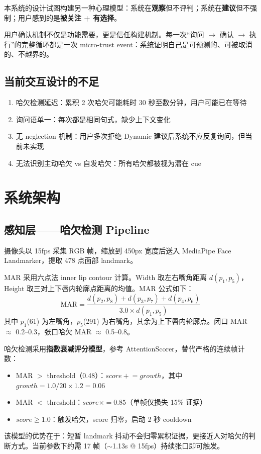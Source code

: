 \documentclass[12pt,a4paper]{ctexart}
\begin{document}
本系统的设计试图构建另一种心理模型：系统在\textbf{观察}但不评判；系统在\textbf{建议}但不强制；用户感到的是\textbf{被关注 + 有选择}。

用户确认机制不仅是功能需要，更是信任构建机制。每一次“询问 $\rightarrow$ 确认 $\rightarrow$ 执行”的完整循环都是一次 micro-trust event：系统证明自己是可预测的、可被取消的、不越界的。

\subsection{当前交互设计的不足}

\begin{enumerate}[label=\arabic*.]
    \item 哈欠检测延迟：累积 2 次哈欠可能耗时 30 秒至数分钟，用户可能已在等待
    \item 询问语单一：每次都是相同句式，缺少上下文变化
    \item 无 neglection 机制：用户多次拒绝 Dynamic 建议后系统不应反复询问，但当前未实现
    \item 无法识别主动哈欠 vs 自发哈欠：所有哈欠都被视为潜在 cue
\end{enumerate}

\section{系统架构}

\subsection{感知层——哈欠检测 Pipeline}

摄像头以 15fps 采集 RGB 帧，缩放到 450px 宽度后送入 MediaPipe Face Landmarker，提取 478 点面部 landmark。

MAR 采用六点法 inner lip contour 计算。Width 取左右嘴角距离 $d(p_1, p_5)$，Height 取三对上下唇内轮廓点距离的均值。MAR 公式如下：
\begin{equation}
\text{MAR} = \frac{d(p_2,p_8) + d(p_3,p_7) + d(p_4,p_6)}{3.0 \times d(p_1,p_5)}
\end{equation}
其中 $p_1$(61) 为左嘴角，$p_5$(291) 为右嘴角，其余为上下唇内轮廓点。闭口 MAR $\approx$ 0.2--0.3，张口哈欠 MAR $\approx$ 0.5--0.8。

哈欠检测采用\textbf{指数衰减评分模型}，参考 AttentionScorer\cite{candeloro}，替代严格的连续帧计数：
\begin{itemize}
    \item MAR $>$ threshold（0.48）：$score \mathrel{+}= growth$，其中 $growth = 1.0 / 20 \times 1.2 = 0.06$
    \item MAR $<$ threshold：$score \times= 0.85$（单帧仅损失 15\% 证据）
    \item $score \geq 1.0$：触发哈欠，score 归零，启动 2 秒 cooldown
\end{itemize}
该模型的优势在于：短暂 landmark 抖动不会归零累积证据，更接近人对哈欠的判断方式。当前参数下约需 17 帧（$\sim$1.13s @ 15fps）持续张口即可触发。
\end{document}
